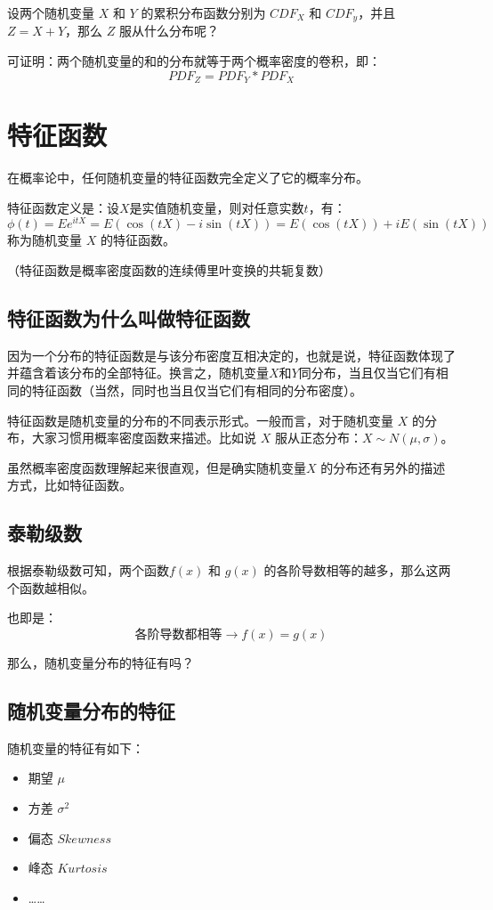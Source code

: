 \documentclass[12pt]{article}
\begin{document}
设两个随机变量 $X$ 和 $Y$ 的累积分布函数分别为 $CDF_X$ 和 $CDF_y$，并且 $Z = X + Y$，那么 $Z$ 服从什么分布呢？

可证明：两个随机变量的和的分布就等于两个概率密度的卷积，即：
$$
PDF_Z = PDF_Y * PDF_X
$$

\section{特征函数}
在概率论中，任何随机变量的特征函数完全定义了它的概率分布。

特征函数定义是：设$X$是实值随机变量，则对任意实数$t$，有：
$$
\phi(t) = Ee^{itX} = E(\cos{(tX)} - i\sin{(tX)}) = E(\cos{(tX)}) + iE(\sin{(tX)})
$$
称为随机变量 $X$ 的特征函数。

（特征函数是概率密度函数的连续傅里叶变换的共轭复数）

\subsection{特征函数为什么叫做特征函数\cite{Why_Called_Feature_Function}\cite{Understand_Feature_Function}}
因为一个分布的特征函数是与该分布密度互相决定的，也就是说，特征函数体现了并蕴含着该分布的全部特征。换言之，随机变量$X$和$Y$同分布，当且仅当它们有相同的特征函数（当然，同时也当且仅当它们有相同的分布密度）。

特征函数是随机变量的分布的不同表示形式。一般而言，对于随机变量 $X$ 的分布，大家习惯用概率密度函数来描述。比如说 $X$ 服从正态分布：$X \sim N(\mu,\sigma)$。

虽然概率密度函数理解起来很直观，但是确实随机变量$X$ 的分布还有另外的描述方式，比如特征函数。

\subsection{泰勒级数}
根据泰勒级数可知，两个函数$f(x)$ 和 $g(x)$ 的各阶导数相等的越多，那么这两个函数越相似。

也即是：
$$
\textbf{各阶导数都相等} \rightarrow f(x) = g(x)
$$

那么，随机变量分布的特征有吗？

\subsection{随机变量分布的特征}
随机变量的特征有如下：
\begin{itemize}
    \item 期望 $\mu$
    \item 方差 $\sigma^2$
    \item 偏态 $Skewness$
    \item 峰态 $Kurtosis$
    \item ……
\end{itemize}
\end{document}
